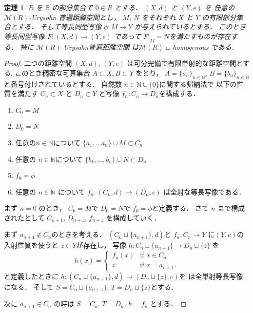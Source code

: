 \documentclass[leqno, 12pt]{jsarticle}
\newtheorem{thm}{定理}[section]
\newcommand{\nn}{\mathbb{N}}
\newcommand{\rr}{\mathbb{R}}
\begin{document}
\begin{thm}\label{thm:pp:hom}
$R$
を
$\rr$
の部分集合で
$0\in R$
とする．
$(X, d)$
と
$(Y, e)$
を
任意の$\mathscr{M}(R)$-Urysohn
普遍距離空間とし，
$M$, 
$N$
をそれぞれ
$X$
と
$Y$
の有限部分集合とする．
そして等長同型写像
$\phi\colon  M\to Y$
が与えられているとする．
このとき等長同型写像
$F\colon  (X, d)\to (Y, e)$
であって
$F|_{M}=N$を満たすものが存在する．
特に
$\mathscr{M}(R)$-Urysohn普遍距離空間
は$\mathscr{M}(R)$-$\omega$-homogenous
である．
\end{thm}
\begin{proof}
二つの距離空間
$(X, d)$, 
$(Y, e)$
は可分完備で有限単射的な距離空間とする. 
このとき稠密な可算集合
$A\subset X, B\subset Y$
をとり，
$A=\{a_{n}\}_{n\in \nn}$,
$B=\{b_{n}\}_{n\in \nn}$
と番号付けされているとする．
自然数
$n\in \nn\cup\{0\}$に関する帰納法で
以下の性質を満たす
$C_{n}\subset X$
と
$D_{n}\subset Y$
と写像
$f_{n}\colon C_{n}\to D_{n}$を構成する．
\begin{enumerate}
\item 
$C_{0}=M$
\item 
$D_{0}=N$
\item 
任意の$n\in \nn$について
$\{a_{1}, \dots a_{n}\}\cup M\subset C_{n}$
\item 
任意の
$n\in \nn$について
$\{b_{1}, \dots, b_{n}\}\cup N\subset D_{n}$
\item 
$f_0=\phi$
\item 
任意の
$n\in \nn$
について
$f_{n}\colon  (C_{n}, d)\to (D_{n}, e)$
は全射な等長写像である．
\end{enumerate}
まず
$n=0$
のとき，
$C_{0}=M$で
$D_{0}=N$で
$f_{0}=\phi$と定義する．
さて
$n$
まで構成されたとして
 $C_{n+1}$, 
 $D_{n+1}$, 
 $f_{n+1}$
 を構成していく．
 
 
 
 
まず
$a_{n+1}\not\in C_{n}$のときを考える．
$(C_{n}\sqcup\{a_{n+1}\}, d)$と
$f_{n}\colon  C_{n}\to Y$
に$(Y, e)$の入射性質を使うと
$z\in Y$が存在し，
写像
$h\colon  C_{n}\sqcup \{a_{n+1}\}\to D_{n}\sqcup \{z\}$
を
\[
h(x)=
\begin{cases}
	f_{n}(x) & \text{if $x\in C_{n}$}\\
	z & \text{if $x=a_{n+1}$}. 
\end{cases}
\]
と定義したときに
$h\colon  (C_{n}\sqcup \{a_{n+1}\}, d)\to (D_{n}\sqcup \{z\}, e)$を
は全単射等長写像になる．
そして
$S=C_{n}\sqcup \{a_{n+1}\}$, 
$T=D_{n}\sqcup\{z\}$とする．

次に
$a_{n+1}\in C_{n}$
の時は
$S=C_{n}$, 
$T=D_{n}$, 
$h=f_{n}$
とする．



\end{proof}
\end{document}
